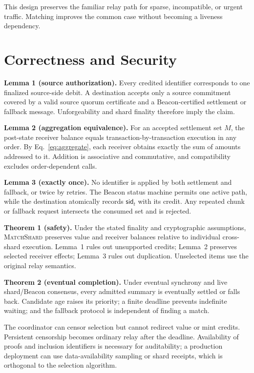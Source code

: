 \documentclass[sigconf,anonymous,review]{acmart}
\newcommand{\system}{\textsc{MatchShard}\xspace}
\newcommand{\sid}{\mathsf{sid}}
\begin{document}
This design preserves the familiar relay path for sparse, incompatible, or urgent traffic. Matching improves the common case without becoming a liveness dependency.

\section{Correctness and Security}

\textbf{Lemma 1 (source authorization).} Every credited identifier corresponds to one finalized source-side debit. A destination accepts only a source commitment covered by a valid source quorum certificate and a Beacon-certified settlement or fallback message. Unforgeability and shard finality therefore imply the claim.

\textbf{Lemma 2 (aggregation equivalence).} For an accepted settlement set $M$, the post-state receiver balance equals transaction-by-transaction execution in any order. By Eq.~\eqref{eq:aggregate}, each receiver obtains exactly the sum of amounts addressed to it. Addition is associative and commutative, and compatibility excludes order-dependent calls.

\textbf{Lemma 3 (exactly once).} No identifier is applied by both settlement and fallback, or twice by retries. The Beacon status machine permits one active path, while the destination atomically records $\sid_t$ with its credit. Any repeated chunk or fallback request intersects the consumed set and is rejected.

\textbf{Theorem 1 (safety).} Under the stated finality and cryptographic assumptions, \system preserves value and receiver balances relative to individual cross-shard execution. Lemma~1 rules out unsupported credits; Lemma~2 preserves selected receiver effects; Lemma~3 rules out duplication. Unselected items use the original relay semantics.

\textbf{Theorem 2 (eventual completion).} Under eventual synchrony and live shard/Beacon consensus, every admitted summary is eventually settled or falls back. Candidate age raises its priority; a finite deadline prevents indefinite waiting; and the fallback protocol is independent of finding a match.

The coordinator can censor selection but cannot redirect value or mint credits. Persistent censorship becomes ordinary relay after the deadline. Availability of proofs and inclusion identifiers is necessary for auditability; a production deployment can use data-availability sampling or shard receipts, which is orthogonal to the selection algorithm.
\end{document}
